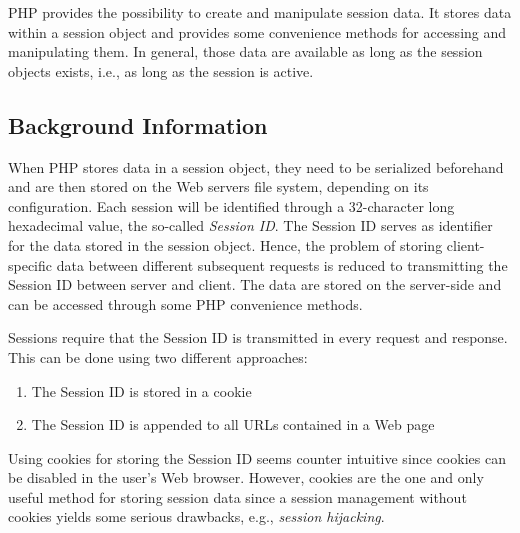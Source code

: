\documentclass[a4paper, justified, notoc]{tufte-handout} %
\begin{document}
PHP provides the possibility to create and manipulate session data. It stores data within a session object and provides some convenience methods for accessing and manipulating them.
In general, those data are available as long as the session objects exists, i.e., as long as the session is active. 


\subsection{Background Information} %
\label{sub:background_information}

When PHP stores data in a session object, they need to be serialized beforehand and are then stored on the Web servers file system, depending on its configuration. 
Each  session will be identified through a 32-character long hexadecimal value, the so-called \emph{Session ID}.
The Session ID serves as identifier for the data stored in the session object. 
Hence, the problem of storing client-specific data between different subsequent requests is reduced to transmitting the Session ID between server and client. 
The data are stored on the server-side and can be accessed through some PHP convenience methods. 

Sessions require that the Session ID is transmitted in every request and response.
This can be done using two different approaches:
\begin{enumerate}
	\item The Session ID is stored in a cookie
	\item The Session ID is appended to all URLs contained in a Web page
\end{enumerate}

Using cookies for storing the Session ID seems counter intuitive since cookies can be disabled in the user's Web browser. However, cookies are the one and only useful method for storing session data since a session management without cookies yields some serious drawbacks, e.g., \emph{session hijacking}.
\end{document}
